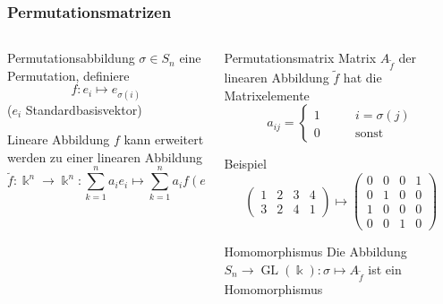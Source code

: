 %
%
%
\bgroup
\begin{frame}[t]
\setlength{\abovedisplayskip}{5pt}
\setlength{\belowdisplayskip}{5pt}
\frametitle{Permutationsmatrizen}
\vspace{-20pt}
\begin{columns}[t,onlytextwidth]
\begin{column}{0.48\textwidth}
\begin{block}{Permutationsabbildung}
$\sigma\in S_n$ eine Permutation, definiere
\[
f
\colon
e_i \mapsto e_{\sigma(i)}
\]
($e_i$ Standardbasisvektor)
\end{block}
\begin{block}{Lineare Abbildung}
$f$ kann erweitert werden zu einer linearen Abbildung
\[
\tilde{f}
\colon
\Bbbk^n \to \Bbbk^n
:
\sum_{k=1}^n a_i e_i
\mapsto
\sum_{k=1}^n a_i f(e_i)
\]
\end{block}
\end{column}
\begin{column}{0.48\textwidth}
\begin{block}{Permutationsmatrix}
Matrix $A_{\tilde{f}}$ der linearen Abbildung $\tilde{f}$
hat die Matrixelemente
\[
a_{ij}
=
\begin{cases}
1&\qquad i=\sigma(j)\\
0&\qquad\text{sonst}
\end{cases}
\]
\end{block}
\vspace{-10pt}
\begin{block}{Beispiel}
\vspace{-20pt}
\[
\begin{pmatrix}
1&2&3&4\\
3&2&4&1
\end{pmatrix}
\mapsto
\begin{pmatrix}
0&0&0&1\\
0&1&0&0\\
1&0&0&0\\
0&0&1&0
\end{pmatrix}
\]
\end{block}
\vspace{-10pt}
\begin{block}{Homomorphismus}
Die Abbildung
$S_n\to\operatorname{GL}(\Bbbk)\colon \sigma \mapsto A_{\tilde{f}}$
ist ein Homomorphismus
\end{block}
\end{column}
\end{columns}
\end{frame}
\egroup
